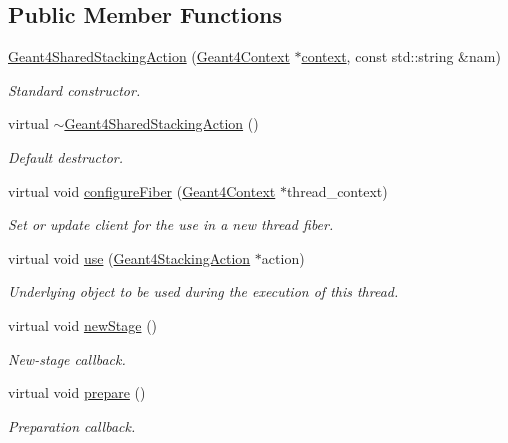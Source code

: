 \subsection*{Public Member Functions}
\begin{DoxyCompactItemize}
\item 
\hyperlink{class_d_d4hep_1_1_simulation_1_1_geant4_shared_stacking_action_ad110c178df46ccebfe884e469ef3e21e}{Geant4\+Shared\+Stacking\+Action} (\hyperlink{class_d_d4hep_1_1_simulation_1_1_geant4_context}{Geant4\+Context} $\ast$\hyperlink{class_d_d4hep_1_1_simulation_1_1_geant4_action_aa9d87f0ec2a72b7fc2591b18f98d75cf}{context}, const std\+::string \&nam)
\begin{DoxyCompactList}\small\item\em Standard constructor. \end{DoxyCompactList}\item 
virtual \hyperlink{class_d_d4hep_1_1_simulation_1_1_geant4_shared_stacking_action_a0cfbf0ceed945aff6b837df8fd5459c7}{$\sim$\+Geant4\+Shared\+Stacking\+Action} ()
\begin{DoxyCompactList}\small\item\em Default destructor. \end{DoxyCompactList}\item 
virtual void \hyperlink{class_d_d4hep_1_1_simulation_1_1_geant4_shared_stacking_action_af204c8b8ed06b5ac14c168ea639c51ac}{configure\+Fiber} (\hyperlink{class_d_d4hep_1_1_simulation_1_1_geant4_context}{Geant4\+Context} $\ast$thread\+\_\+context)
\begin{DoxyCompactList}\small\item\em Set or update client for the use in a new thread fiber. \end{DoxyCompactList}\item 
virtual void \hyperlink{class_d_d4hep_1_1_simulation_1_1_geant4_shared_stacking_action_a8201cb5679ace2713e6a34ebe1282dbf}{use} (\hyperlink{class_d_d4hep_1_1_simulation_1_1_geant4_stacking_action}{Geant4\+Stacking\+Action} $\ast$action)
\begin{DoxyCompactList}\small\item\em Underlying object to be used during the execution of this thread. \end{DoxyCompactList}\item 
virtual void \hyperlink{class_d_d4hep_1_1_simulation_1_1_geant4_shared_stacking_action_af92666552c404908a7e99c8145846c5f}{new\+Stage} ()
\begin{DoxyCompactList}\small\item\em New-\/stage callback. \end{DoxyCompactList}\item 
virtual void \hyperlink{class_d_d4hep_1_1_simulation_1_1_geant4_shared_stacking_action_a22e3516dfed160da7a3b246d28098891}{prepare} ()
\begin{DoxyCompactList}\small\item\em Preparation callback. \end{DoxyCompactList}\end{DoxyCompactItemize}
